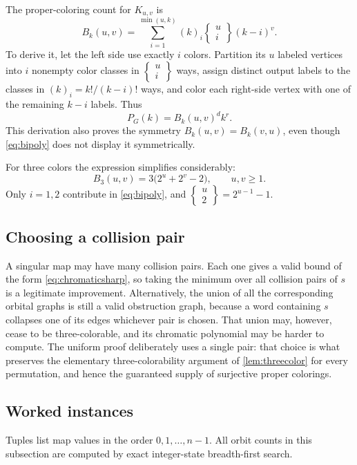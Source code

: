 \documentclass[11pt,a4paper]{article}
\numberwithin{equation}{section}
\theoremstyle{definition}
\theoremstyle{remark}
\newcommand{\fall}[2]{(#1)_{#2}}
\newcommand{\stirling}[2]{\left\{\!\begin{matrix}#1\\#2\end{matrix}\!\right\}}
\begin{document}
The proper-coloring count for $K_{u,v}$ is
\begin{equation}\label{eq:bipoly}
 B_k(u,v)=\sum_{i=1}^{\min(u,k)}
      \fall{k}{i}\stirling{u}{i}(k-i)^v.
\end{equation}
To derive it, let the left side use exactly $i$ colors. Partition its $u$
labeled vertices into $i$ nonempty color classes in
$\stirling{u}{i}$ ways, assign distinct output labels to the classes in
$\fall{k}{i}=k!/(k-i)!$ ways, and color each right-side vertex with one of
the remaining $k-i$ labels. Thus
\begin{equation}\label{eq:diffcount}
 P_G(k)=B_k(u,v)^d k^r.
\end{equation}
This derivation also proves the symmetry $B_k(u,v)=B_k(v,u)$, even though
\eqref{eq:bipoly} does not display it symmetrically.

For three colors the expression simplifies considerably:
\begin{equation}\label{eq:threebip}
 B_3(u,v)=3\bigl(2^u+2^v-2\bigr),\qquad u,v\ge1.
\end{equation}
Only $i=1,2$ contribute in \eqref{eq:bipoly}, and
$\stirling{u}{2}=2^{u-1}-1$.

\subsection{Choosing a collision pair}

A singular map may have many collision pairs. Each one gives a valid bound of
the form \eqref{eq:chromaticsharp}, so taking the minimum over all collision
pairs of $s$ is a legitimate improvement. Alternatively, the union of all the
corresponding orbital graphs is still a valid obstruction graph, because a
word containing $s$ collapses one of its edges whichever pair is chosen.
That union may, however, cease to be three-colorable, and its chromatic
polynomial may be harder to compute. The uniform proof deliberately uses a
single pair: that choice is what preserves the elementary
three-colorability argument of \cref{lem:threecolor} for every permutation,
and hence the guaranteed supply of surjective proper colorings.

\subsection{Worked instances}\label{sec:instances}

Tuples list map values in the order $0,1,\ldots,n-1$. All orbit counts in
this subsection are computed by exact integer-state breadth-first search.
\end{document}
